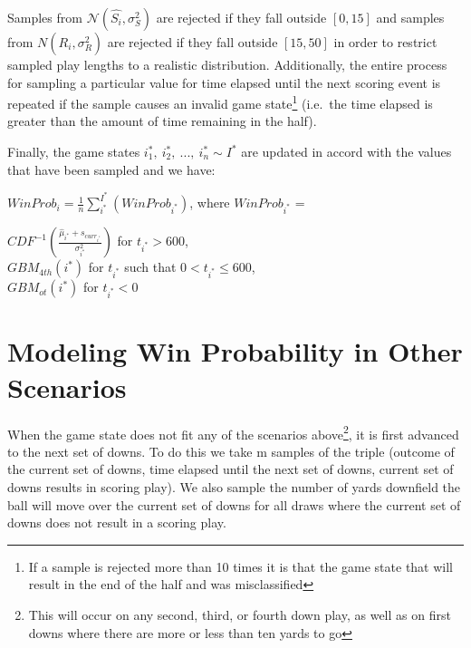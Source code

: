 \documentclass[12pt,twoside]{dukestatscithesis}
\begin{document}
Samples from \(\mathcal{N}(\hat{S_i},\sigma_{S}^{2})\) are rejected if they fall outside \([0, 15]\) and samples from \({N}(\hat{R_i},\sigma_{R}^{2})\) are rejected if they fall outside \([15, 50]\) in order to restrict sampled play lengths to a realistic distribution. Additionally, the entire process for sampling a particular value for time elapsed until the next scoring event is repeated if the sample causes an invalid game state\footnote{If a sample is rejected more than 10 times it is that the game state that will result in the end of the half and was misclassified} (i.e.~the time elapsed is greater than the amount of time remaining in the half).

Finally, the game states \(i^*_1, \:i^*_2, \:..., \: i^*_n \sim I^*\) are updated in accord with the values that have been sampled and we have:

\(WinProb_i = \frac{1}{n} \sum_{i^*}^{I^*}(WinProb_{i^*})\), where \(WinProb_{i^*}\) =

\(CDF^{-1}(\frac{\hat{\mu}_{i^*} + s_{curr_{i^*}}}{\sigma^{2}_{i^*}})\) for \(t_{i^*} > 600\),\\
\(GBM_{4th}(i^*)\) for \(t_{i^*}\) such that \(0 < t_{i^*} \leq 600\),\\
\(GBM_{ot}(i^*)\) for \(t_{i^*} < 0\)

\hypertarget{modeling-win-probability-in-other-scenarios}{%
\section{Modeling Win Probability in Other Scenarios}\label{modeling-win-probability-in-other-scenarios}}

When the game state does not fit any of the scenarios above\footnote{This will occur on any second, third, or fourth down play, as well as on first downs where there are more or less than ten yards to go}, it is first advanced to the next set of downs. To do this we take m samples of the triple (outcome of the current set of downs, time elapsed until the next set of downs, current set of downs results in scoring play). We also sample the number of yards downfield the ball will move over the current set of downs for all draws where the current set of downs does not result in a scoring play.
\end{document}
